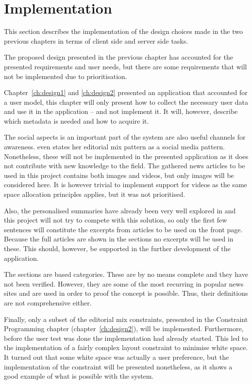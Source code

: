 \chapter{Implementation} %
\label{ch:implementation}
This section describes the implementation of the design choices made in the two previous chapters in terms of client side and server side tasks.

The proposed design presented in the previous chapter has accounted for the presented requirements and user needs, but there are some requirements that will not be implemented due to prioritisation.

Chapter~\ref{ch:design1} and \ref{ch:design2} presented an application that accounted for a user model, this chapter will only present how to collect the necessary user data and use it in the application -- and not implement it. It will, however, describe which metadata is needed and how to acquire it.

The social aspects is an important part of the system are also useful channels for awareness. \cite{Tidwell} even states her editorial mix pattern as a social media pattern. Nonetheless, these will not be implemented in the presented application as it does not contribute with new knowledge to the field. The gathered news articles to be used in this project contains both images and videos, but only images will be considered here. It is however trivial to implement support for videos as the same space allocation principles applies, but it was not prioritised.

Also, the personalised summaries have already been very well explored in \cite{fulltext.pdf} and this project will not try to compete with this solution, so only the first few sentences will constitute the excerpts from articles to be used on the front page. Because the full articles are shown in the sections no excerpts will be used in these. This should, however, be supported in the further development of the application.

The sections are based categories. These are by no means complete and they have not been verified. However, they are some of the most recurring in popular news sites and are used in order to proof the concept is possible. Thus, their definitions are not comprehensive either.

Finally, only a subset of the editorial mix constraints, presented in the Constraint Programming chapter (chapter~\ref{ch:design2}), will be implemented. Furthermore, before the user test was done the implementation had already started. This led to the implementation of a fairly complex layout constraint to minimise white space. It turned out that some white space was actually a user preference, but the implementation of the constraint will be presented nonetheless, as it shows a good example of what is possible with the system. 
%
\clearpage
